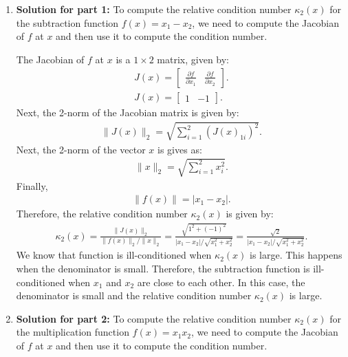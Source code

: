 \documentclass[11pt,onecolumn]{article}
\begin{document}
\begin{enumerate}
    \item \textbf{Solution for part 1:}
    To compute the relative condition number \( \kappa_{2}(x) \) for the subtraction function \( f(x) = x_1 - x_2 \), we need to compute the Jacobian of \( f \) at \( x \) and then use it to compute the condition number.

    The Jacobian of \( f \) at \( x \) is a \( 1 \times 2 \) matrix, given by:
    \begin{align}
        J(x) = \begin{bmatrix}
            \frac{\partial f}{\partial x_1} & \frac{\partial f}{\partial x_2}
        \end{bmatrix}.\\
        J(x) = \begin{bmatrix}
            1 & -1
        \end{bmatrix}.
    \end{align}
    Next, the 2-norm of the Jacobian matrix is given by:
    \begin{align}
        \|J(x)\|_2 = \sqrt{\sum_{i=1}^2 (J(x)_{1i})^2}.
    \end{align}
    Next, the 2-norm of the vector $x$ is gives as:
    \begin{align}
        \|x\|_2 = \sqrt{\sum_{i=1}^2 x_i^2}.
    \end{align}
    Finally,
    \begin{align}
        \|f(x)\| = |x_1 - x_2|.
    \end{align}
    Therefore, the relative condition number \( \kappa_{2}(x) \) is given by:
    \begin{align}
        \kappa_{2}(x) = \frac{\|J(x)\|_{2}}{\|f(x)\|_{2}/\|x\|_{2}} = \frac{\sqrt{1^2 + (-1)^2}}{|x_1 - x_2|/\sqrt{x_1^2 + x_2^2}} = \frac{\sqrt{2}}{|x_1 - x_2|/\sqrt{x_1^2 + x_2^2}}.
    \end{align}
    We know that function is ill-conditioned when \( \kappa_{2}(x) \) is large. This happens when the denominator is small. Therefore, the subtraction function is ill-conditioned when \( x_1 \) and \( x_2 \) are close to each other. In this case, the denominator is small and the relative condition number \( \kappa_{2}(x) \) is large.

    \item \textbf{Solution for part 2:}
    To compute the relative condition number \( \kappa_{2}(x) \) for the multiplication function \( f(x) = x_1x_2 \), we need to compute the Jacobian of \( f \) at \( x \) and then use it to compute the condition number.


\end{enumerate}
\end{document}
